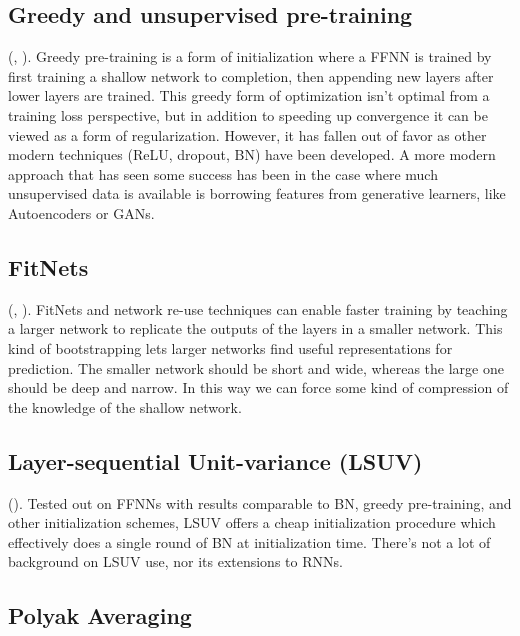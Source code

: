 \documentclass{article}
\begin{document}
\subsection{Greedy and unsupervised pre-training}

(, ). Greedy pre-training is a form of initialization where a FFNN is trained by first training a shallow network to completion, then appending new layers after lower layers are trained. This greedy form of optimization isn't optimal from a training loss perspective, but in addition to speeding up convergence it can be viewed as a form of regularization. However, it has fallen out of favor as other modern techniques (ReLU, dropout, BN) have been developed. A more modern approach that has seen some success has been in the case where much unsupervised data is available is borrowing features from generative learners, like Autoencoders or GANs.
\subsection{FitNets}

(, ). FitNets and network re-use techniques can enable faster training by teaching a larger network to replicate the outputs of the layers in a smaller network. This kind of bootstrapping lets larger networks find useful representations for prediction. The smaller network should be short and wide, whereas the large one should be deep and narrow. In this way we can force some kind of compression of the knowledge of the shallow network.
\subsection{Layer-sequential Unit-variance (LSUV)}

(). Tested out on FFNNs with results comparable to BN, greedy pre-training, and other initialization schemes, LSUV offers a cheap initialization procedure which effectively does a single round of BN at initialization time. There's not a lot of background on LSUV use, nor its extensions to RNNs.

\subsection{Polyak Averaging}
\end{document}
